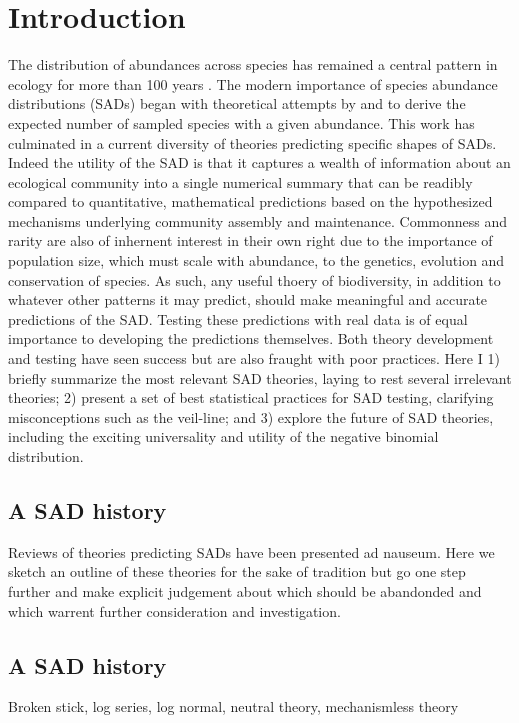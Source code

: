 \documentclass[12pt]{article}
\begin{document}
\section*{Introduction}

The distribution of abundances across species has remained a central
pattern in ecology for more than 100 years
\citep{RaunkaierLawFrequence}. The modern importance of species
abundance distributions (SADs) began with theoretical attempts by
\cite{fisher} and \cite{preston} to derive the expected number of
sampled species with a given abundance. This work has culminated in a
current diversity of theories predicting specific shapes of
SADs. Indeed the utility of the SAD is that it captures a wealth of
information about an ecological community into a single numerical
summary that can be readibly compared to quantitative, mathematical
predictions based on the hypothesized mechanisms underlying community
assembly and maintenance.  Commonness and rarity are also of inhernent
interest in their own right due to the importance of population size,
which must scale with abundance, to the genetics, evolution and
conservation of species. As such, any useful thoery of biodiversity,
in addition to whatever other patterns it may predict, should make
meaningful and accurate predictions of the SAD. Testing these
predictions with real data is of equal importance to developing the
predictions themselves.  Both theory development and testing have seen
success \citep{} but are also fraught with poor practices. Here I 1)
briefly summarize \citep[not needing to re-invent more detailed
reviews][]{stuff} the most relevant SAD theories, laying to rest
several irrelevant theories; 2) present a set of best statistical
practices for SAD testing, clarifying misconceptions such as the
veil-line; and 3) explore the future of SAD theories, including the
exciting universality and utility of the negative binomial
distribution.

\subsection{A SAD history}
Reviews of theories predicting SADs have been presented ad
nauseum. Here we sketch an outline of these theories for the sake of
tradition but go one step further and make explicit judgement about
which should be abandonded and which warrent further consideration and
investigation.

\subsection{A SAD history}
Broken stick, log series, log normal, neutral theory, mechanismless
theory
\end{document}
